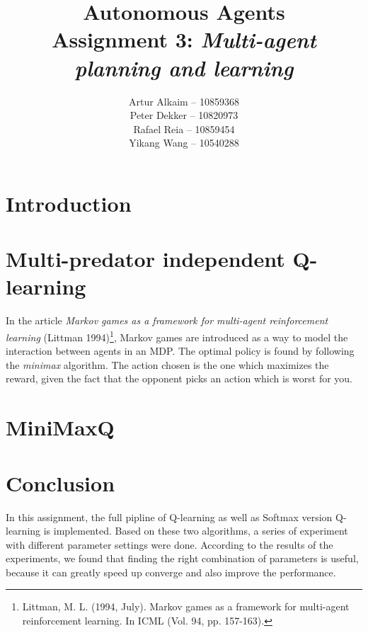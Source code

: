 \documentclass{article}
\begin{document}
\title{Autonomous Agents\\
Assignment 3: \emph{Multi-agent planning and learning}}
\author{
Artur Alkaim -- 10859368\\
Peter Dekker -- 10820973\\
Rafael Reia -- 10859454\\
Yikang Wang -- 10540288\\
}
\maketitle
\section{Introduction}

\section{Multi-predator independent Q-learning}
In the article \emph{Markov games as a framework for multi-agent reinforcement learning} (Littman 1994)\footnote{Littman, M. L. (1994, July). Markov games as a framework for multi-agent reinforcement learning. In ICML (Vol. 94, pp. 157-163).}, Markov games are introduced as a way to model the interaction between agents in an MDP. The optimal policy is found by following the \emph{minimax} algorithm. The action chosen is the one which maximizes the reward, given the fact that the opponent picks an action which is worst for you.
\section{MiniMaxQ}

\section{Conclusion}

In this assignment, the full pipline of Q-learning as well as Softmax version Q-learning is implemented. Based on these two algorithms, a series of experiment with different parameter settings were done. According to the results of the experiments, we found that finding the right combination of parameters is useful, because it can greatly speed up converge and also improve the performance.
\end{document}

